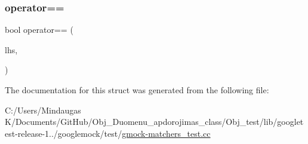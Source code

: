 \mbox{\label{structtesting_1_1gmock__matchers__test_1_1_non_implicitly_constructible_type_with_operator_eq_a801c8151d7f7ff24243019980934d143}} 
\subsubsection{\texorpdfstring{operator==}{operator==}\hspace{0.1cm}{\footnotesize\ttfamily [2/2]}}
{\footnotesize\ttfamily bool operator== (\begin{DoxyParamCaption}\item[{int}]{lhs,  }\item[{const Non\+Implicitly\+Constructible\+Type\+With\+Operator\+Eq \&}]{ }\end{DoxyParamCaption})\hspace{0.3cm}{\ttfamily [friend]}}



The documentation for this struct was generated from the following file\+:\begin{DoxyCompactItemize}
\item 
C\+:/\+Users/\+Mindaugas K/\+Documents/\+Git\+Hub/\+Obj\+\_\+\+Duomenu\+\_\+apdorojimas\+\_\+class/\+Obj\+\_\+test/lib/googletest-\/release-\/1../googlemock/test/\mbox{\hyperlink{_obj__test_2lib_2googletest-release-1_88_81_2googlemock_2test_2gmock-matchers__test_8cc}{gmock-\/matchers\+\_\+test.\+cc}}\end{DoxyCompactItemize}
